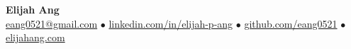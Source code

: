 \begin{center}
  {\fontsize{22}{24}\selectfont\bfseries Elijah Ang}\\[4pt]
  \small \href{mailto:eang0521@gmail.com}{eang0521@gmail.com} \; $\bullet$ \; \href{https://linkedin.com/in/elijah-p-ang}{linkedin.com/in/elijah-p-ang} \; $\bullet$ \; \href{https://github.com/eang0521}{github.com/eang0521} \; $\bullet$ \; \href{https://www.elijahang.com}{elijahang.com}
\end{center}
